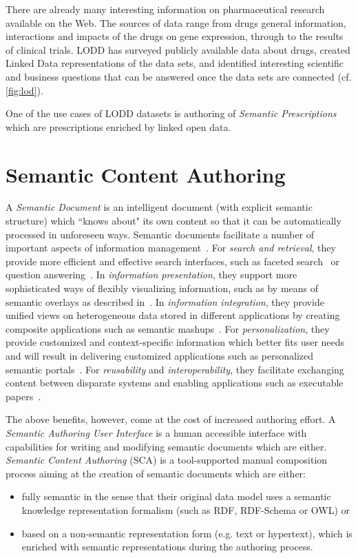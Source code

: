 \documentclass[conference]{IEEEtran}
\begin{document}
There are already many interesting information on pharmaceutical research available on the Web.
The sources of data range from drugs general information, interactions and impacts of the drugs on gene expression, through to the results of clinical trials.
LODD\cite{lodrug} has surveyed publicly available data about drugs, created Linked Data representations of the data sets, and identified interesting scientific and business questions that can be answered once the data sets are connected (cf. \autoref{fig:lod}).

One of the use cases of LODD datasets is authoring of \emph{Semantic Prescriptions} which are prescriptions enriched by linked open data.

\section{Semantic Content Authoring}
\label{sec:sca}
 A \emph{Semantic Document} is an intelligent document (with explicit semantic structure) which ``knows about" its own content so that it can be automatically processed in unforeseen ways.
Semantic documents facilitate a number of important aspects of information management~\cite{rdface}.
For \emph{search and retrieval}, they provide more efficient and effective search interfaces, such as faceted search~\cite{tunkenlang2009faceted} or question answering~\cite{Lopez2011}.
In \emph{information presentation}, they support more sophisticated ways of flexibly visualizing information, such as by means of semantic overlays as described in~\cite{Burel2009}.
In \emph{information integration}, they provide unified views on heterogeneous data stored in different applications by creating composite applications such as semantic mashups~\cite{Ankolekar2007}.
For \emph{personalization}, they provide customized and context-specific information which better fits user needs and will
result in delivering customized applications such as personalized semantic portals~\cite{ecs2007}.
For \emph{reusability} and \emph{interoperability}, they facilitate exchanging content between disparate systems and enabling applications such as executable papers~\cite{Muller2011}.


The above benefits, however, come at the cost of increased authoring effort. %
A \emph{Semantic Authoring User Interface} is a human accessible interface with capabilities for writing and modifying semantic documents which are either.
\emph{Semantic Content Authoring} (SCA) is a tool-supported manual composition process aiming at the creation of semantic documents which are either:
\begin{itemize}
	\item fully semantic in the sense that their original data model uses a semantic knowledge representation formalism (such as RDF, RDF-Schema or OWL) or
	\item based on a non-semantic representation form (e.g. text or hypertext), which is enriched with semantic representations during the authoring process.\\
\end{itemize}
\end{document}

